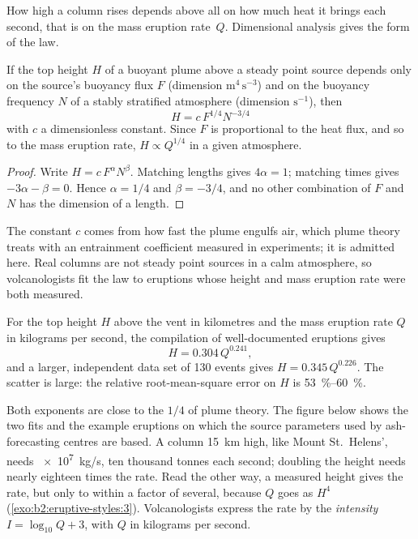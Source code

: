 How high a column rises depends above all on how much heat it brings each
second, that is on the mass eruption rate~$Q$. Dimensional analysis gives the
form of the law.

\begin{proposition}\label{prop:b2:eruptive-styles:plume}
If the top height $H$ of a buoyant plume above a steady point source depends only
on the source's buoyancy flux $F$ (dimension $\mathrm{m^4\,s^{-3}}$) and on the
buoyancy frequency $N$ of a stably stratified atmosphere (dimension
$\mathrm{s^{-1}}$), then
\[
H = c\,F^{1/4}N^{-3/4}
\]
with $c$ a dimensionless constant. Since $F$ is proportional to the heat flux, and so
to the mass eruption rate, $H \propto Q^{1/4}$ in a given atmosphere.
\end{proposition}

\begin{proof}
Write $H = c\,F^{\alpha}N^{\beta}$. Matching lengths gives $4\alpha = 1$; matching
times gives $-3\alpha - \beta = 0$. Hence $\alpha = 1/4$ and $\beta = -3/4$, and no
other combination of $F$ and $N$ has the dimension of a length.
\end{proof}

The constant $c$ comes from how fast the plume engulfs air, which plume theory
treats with an entrainment coefficient measured in experiments; it is admitted
here. Real columns are not steady point sources in a calm atmosphere, so
volcanologists fit the law to eruptions whose height and mass eruption rate were
both measured.

\begin{proposition}\label{prop:b2:eruptive-styles:mastin}
For the top height $H$ above the vent in kilometres and the mass eruption rate
$Q$ in kilograms per second, the compilation of well-documented eruptions gives
\[
H = 0.304\,Q^{0.241},
\]
and a larger, independent data set of 130 events gives $H = 0.345\,Q^{0.226}$.
The scatter is large: the relative root-mean-square error on $H$ is
\qtyrange{53}{60}{\percent}.
\end{proposition}
\admitted

Both exponents are close to the $1/4$ of plume theory. The figure below shows
the two fits and the example eruptions on which the source parameters used by
ash-forecasting centres are based. A column \qty{15}{km} high, like Mount
St.~Helens', needs \qty{e7}{kg/s}, ten thousand tonnes each second; doubling the
height needs nearly eighteen times the rate. Read the other way, a measured height gives
the rate, but only to within a factor of several, because $Q$ goes as $H^4$
(\cref{exo:b2:eruptive-styles:3}). Volcanologists express the rate by the \emph{intensity} $I =
\log_{10}Q + 3$, with $Q$ in kilograms per second.


